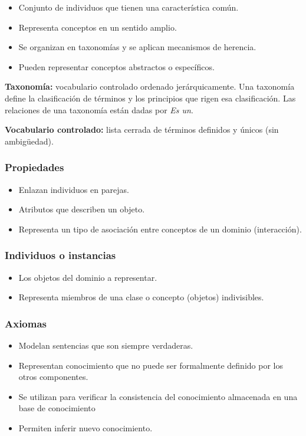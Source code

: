 \documentclass[a4paper,12pt,twoside,final,spanish]{article}
\begin{document}
	\begin{itemize}
	\item Conjunto de individuos que tienen una característica común.
	\item Representa conceptos en un sentido amplio.
	\item Se organizan en taxonomías y se aplican mecanismos de herencia.
	\item Pueden representar conceptos abstractos o específicos.
	\end{itemize}

\textbf{Taxonomía:} vocabulario controlado ordenado jerárquicamente. Una taxonomía define la clasificación de términos y los principios que rigen esa clasificación. Las relaciones de una taxonomía están dadas por \textit{Es un}.

\textbf{Vocabulario controlado:} lista cerrada de términos definidos y únicos (sin ambigüedad).

\subsubsection{Propiedades}

	\begin{itemize}
	\item Enlazan individuos en parejas.
	\item Atributos que describen un objeto.
	\item Representa un tipo de asociación entre conceptos de un dominio 					(interacción).
	\end{itemize}
	
\subsubsection{Individuos o instancias}

	\begin{itemize}
	\item Los objetos del dominio a representar.
	\item Representa miembros de una clase o concepto (objetos) indivisibles.
	\end{itemize}
	
\subsubsection{Axiomas}

	\begin{itemize}
	\item Modelan sentencias que son siempre verdaderas.
	\item Representan conocimiento que no puede ser formalmente definido por los otros 	componentes.
	\item Se utilizan para verificar la consistencia del conocimiento almacenada en 		una base de conocimiento
	\item Permiten inferir nuevo conocimiento.
	\end{itemize}
\end{document}
